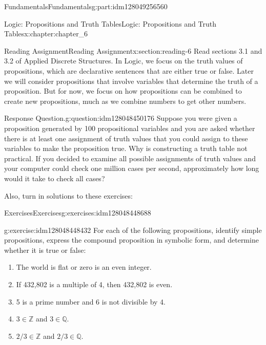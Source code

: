 \documentclass[oneside,10pt,]{book}
\numberwithin{equation}{section}
\begin{document}
\begin{partptx}{Fundamentals}{}{Fundamentals}{}{}{g:part:idm128049256560}
\begin{chapterptx}{Logic: Propositions and Truth Tables}{}{Logic: Propositions and Truth Tables}{}{}{x:chapter:chapter_6}
%
%
\typeout{************************************************}
\typeout{************************************************}
%
\begin{sectionptx}{Reading Assignment}{}{Reading Assignment}{}{}{x:section:reading-6}
Read sections 3.1 and 3.2 of Applied Discrete Structures.  In Logic, we focus on the truth values of propositions, which are declarative sentences that are either true or false.  Later we will consider propositions that involve variables that determine the truth of a proposition. But for now, we focus on how propositions can be combined to create new propositions, much as we combine numbers to get other numbers.%
\begin{question}{Response Question.}{g:question:idm128048450176}%
Suppose you were given a proposition generated by 100 propositional variables and you are asked whether there is at least one assignment of truth values that you could assign to these variables to make the proposition true. Why is constructing a truth table not practical.  If you decided to examine all possible assignments of truth values and your computer could check one million cases per second, approximately how long would it take to check all cases?%
\end{question}
Also, turn in solutions to these exercises:%
%
%
\typeout{************************************************}
\typeout{************************************************}
%
\begin{exercises-subsection}{Exercises}{}{Exercises}{}{}{g:exercises:idm128048448688}
\par\medskip\noindent%
%
\begin{exercisegroup}
\begin{divisionexerciseeg}{1}{}{}{g:exercise:idm128048448432}%
For each of the following propositions, identify simple propositions, express the compound proposition in symbolic form, and determine whether it is true or false:%
\par
%
\begin{enumerate}[label=(\alph*)]
\item{}The world is flat or zero is an even integer.%
\item{}If 432,802 is a multiple of 4, then 432,802 is even.%
\item{}5 is a prime number and 6 is not divisible by 4.%
\item{}\(3 \in \mathbb{Z}\) and \(3 \in  \mathbb{Q}\).%
\item{}\(2/3 \in  \mathbb{Z}\) and \(2/3 \in  \mathbb{Q}\).%

\end{enumerate}
\end{divisionexerciseeg}
\end{exercisegroup}
\end{exercises-subsection}
\end{sectionptx}
\end{chapterptx}
\end{partptx}
\end{document}
